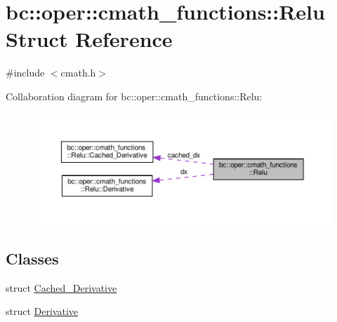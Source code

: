 \hypertarget{structbc_1_1oper_1_1cmath__functions_1_1Relu}{}\section{bc\+:\+:oper\+:\+:cmath\+\_\+functions\+:\+:Relu Struct Reference}
\label{structbc_1_1oper_1_1cmath__functions_1_1Relu}


{\ttfamily \#include $<$cmath.\+h$>$}



Collaboration diagram for bc\+:\+:oper\+:\+:cmath\+\_\+functions\+:\+:Relu\+:\nopagebreak
\begin{figure}[H]
\begin{center}
\leavevmode
\includegraphics[width=350pt]{structbc_1_1oper_1_1cmath__functions_1_1Relu__coll__graph}
\end{center}
\end{figure}
\subsection*{Classes}
\begin{DoxyCompactItemize}
\item 
struct \hyperlink{structbc_1_1oper_1_1cmath__functions_1_1Relu_1_1Cached__Derivative}{Cached\+\_\+\+Derivative}
\item 
struct \hyperlink{structbc_1_1oper_1_1cmath__functions_1_1Relu_1_1Derivative}{Derivative}
\end{DoxyCompactItemize}
